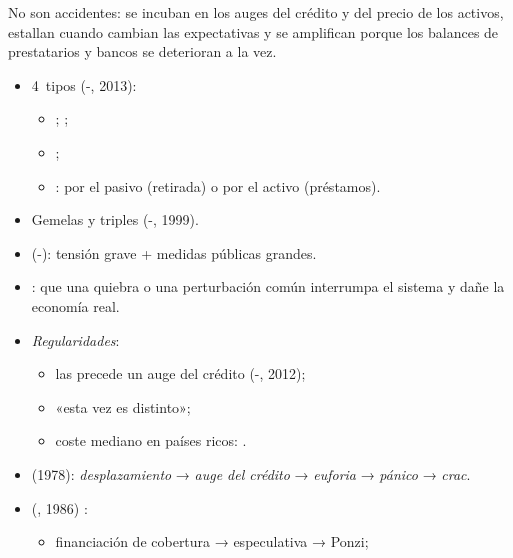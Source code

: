\documentclass{article}
\begin{document}
\begin{columnas}
\begin{ideaclave}
No son accidentes: se incuban en los auges del crédito y del precio de los activos, estallan cuando cambian las expectativas y se amplifican porque los balances de prestatarios y bancos se deterioran a la vez.
\end{ideaclave}
\begin{itemize}
\item 4~tipos (-, 2013):
  \begin{itemize}
  \item {};  ;
  \item {} ;
  \item {}: por el pasivo (retirada) o por el activo (préstamos).
  \end{itemize}
\item Gemelas y triples (-, 1999).
\item {} (-): tensión grave + medidas públicas grandes.
\item {}: que una quiebra o una perturbación común interrumpa el sistema y dañe la economía real.
\item \emph{Regularidades}:
  \begin{itemize}
  \item las precede un auge del crédito (-, 2012);
  \item «esta vez es distinto»;
  \item coste mediano en países ricos: .
  \end{itemize}
\end{itemize}
\begin{itemize}
\item {} (1978): \emph{desplazamiento} → \emph{auge del crédito} → \emph{euforia} → \emph{pánico} → \emph{crac}.
\item {} (, 1986) :
  \begin{itemize}
  \item financiación de cobertura → especulativa → Ponzi;

\end{itemize}
\end{itemize}
\end{columnas}
\end{document}
